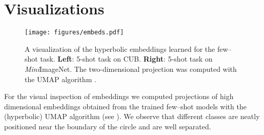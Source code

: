 \documentclass[10pt,twocolumn,letterpaper]{article}
\begin{document}
\section{Visualizations}{\label{app:visualization}}
\begin{figure*}[htb!]
    \centering
    \texttt{[image: figures/embeds.pdf]}
    \caption{A visualization of the hyperbolic embeddings learned for the few--shot task. \textbf{Left}: 5-shot task on CUB. \textbf{Right}: 5-shot task on \emph{Mini}ImageNet. The two-dimensional projection was computed with the UMAP algorithm \cite{mcinnes2018umap}.
    }
    \label{fig:embeds}
\end{figure*}
For the visual inspection of embeddings we computed projections of high dimensional embeddings obtained from the trained few--shot models with the (hyperbolic) UMAP algorithm \cite{mcinnes2018umap} (see ). We observe that different classes are neatly positioned near the boundary of the circle and are well separated. 
\end{document}
